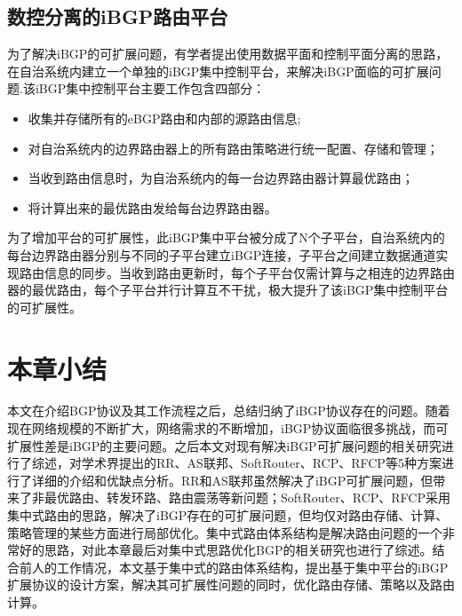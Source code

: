 \subsection{数控分离的iBGP路由平台}
为了解决iBGP的可扩展问题，有学者提出使用数据平面和控制平面分离的思路，在自治系统内建立一个单独的iBGP集中控制平台\cite{Oprescu2011Rethinking}，来解决iBGP面临的可扩展问题.该iBGP集中控制平台主要工作包含四部分：
\begin{itemize}
  \item 收集并存储所有的eBGP路由和内部的源路由信息;
  \item 对自治系统内的边界路由器上的所有路由策略进行统一配置、存储和管理；
  \item 当收到路由信息时，为自治系统内的每一台边界路由器计算最优路由；
  \item 将计算出来的最优路由发给每台边界路由器。
\end{itemize}

为了增加平台的可扩展性，此iBGP集中平台被分成了N个子平台，自治系统内的每台边界路由器分别与不同的子平台建立iBGP连接，子平台之间建立数据通道实现路由信息的同步。当收到路由更新时，每个子平台仅需计算与之相连的边界路由器的最优路由，每个子平台并行计算互不干扰，极大提升了该iBGP集中控制平台的可扩展性。


\section{本章小结}

本文在介绍BGP协议及其工作流程之后，总结归纳了iBGP协议存在的问题。随着现在网络规模的不断扩大，网络需求的不断增加，iBGP协议面临很多挑战，而可扩展性差是iBGP的主要问题。之后本文对现有解决iBGP可扩展问题的相关研究进行了综述，对学术界提出的RR、AS联邦、SoftRouter、RCP、RFCP等5种方案进行了详细的介绍和优缺点分析。RR和AS联邦虽然解决了iBGP可扩展问题，但带来了非最优路由、转发环路、路由震荡等新问题；SoftRouter、RCP、RFCP采用集中式路由的思路，解决了iBGP存在的可扩展问题，但均仅对路由存储、计算、策略管理的某些方面进行局部优化。集中式路由体系结构是解决路由问题的一个非常好的思路，对此本章最后对集中式思路优化BGP的相关研究也进行了综述。结合前人的工作情况，本文基于集中式的路由体系结构，提出基于集中平台的iBGP扩展协议的设计方案，解决其可扩展性问题的同时，优化路由存储、策略以及路由计算。
